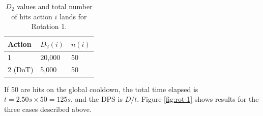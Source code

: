 \documentclass{article}
\begin{document}
            \begin{table}[H]
                \centering
                \caption{$D_2$ values and total number of hits action $i$ lands for Rotation 1.}\label{t:rot1}
                \begin{tabular}{@{}lll@{}}
                \toprule
                Action & $D_2(i)$ & $n(i)$ \\ \midrule
                1       & 20,000 & 50   \\
                2 (DoT) &  5,000 & 50   \\ \bottomrule
                \end{tabular}
            \end{table}

            If 50 are hits on the global cooldown, the total time elapsed is $t = 2.50 s \times 50 =125s$, and the DPS is $D / t$. Figure \ref{fig:rot-1} shows results for the three cases described above. 
            
\end{document}
